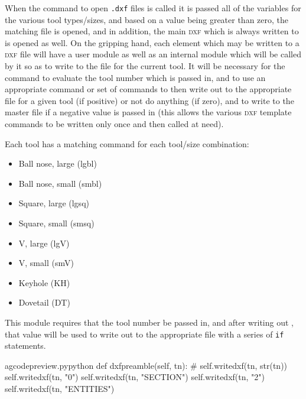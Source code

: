 \documentclass{ltxdoc}
\begin{document}
When the command to open \verb|.dxf| files is called it is passed all of the variables for the various tool types/sizes, and based on a value being greater than zero, the matching file is opened, and in addition, the main \textsc{dxf} which is always written to is opened as well. On the gripping hand, each element which may be written to a \textsc{dxf} file will have a user module as well as an internal module which will be called by it so as to write to the file for the current tool. It will be necessary for the  command to evaluate the tool number which is passed in, and to use an appropriate command or set of commands to then write out to the appropriate file for a given tool (if positive) or not do anything (if zero), and to write to the master file if a negative value is passed in (this allows the various \textsc{dxf} template commands to be written only once and then called at need).

Each tool has a matching command for each tool/size combination:

\begin{itemize}
\item Ball nose, large (lgbl) 
\item Ball nose, small (smbl) 
\item Square, large (lgsq) 
\item Square, small (smsq) 
\item V, large (lgV) 
\item V, small (smV) 
\item Keyhole (KH) 
\item Dovetail (DT) 
\end{itemize}
 

This module requires that the tool number be passed in, and after writing out , that value will be used to write out to the appropriate file with a series of \texttt{if} statements.
 
\lstset{firstnumber=\thegcpy}
\begin{writecode}{a}{gcodepreview.py}{python}
    def dxfpreamble(self, tn):
#        self.writedxf(tn, str(tn))
        self.writedxf(tn, "0")
        self.writedxf(tn, "SECTION")
        self.writedxf(tn, "2")
        self.writedxf(tn, "ENTITIES")

\end{writecode}
\addtocounter{gcpy}{7}
 
\end{document}
